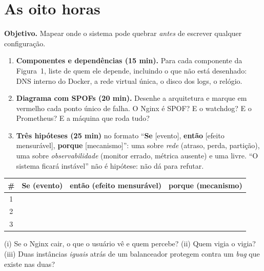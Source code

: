 \section{As oito horas}


\textbf{Objetivo.} Mapear onde o sistema pode quebrar \emph{antes} de escrever qualquer configuração.

\begin{enumerate}[leftmargin=*]
  \item \textbf{Componentes e dependências (15 min).} Para cada componente da Figura~1, liste de quem ele depende,
        incluindo o que não está desenhado: DNS interno do Docker, a rede virtual única, o disco dos logs, o relógio.
  \item \textbf{Diagrama com SPOFs (20 min).} Desenhe a arquitetura e marque \textcolor{vermelho}{em vermelho} cada
        ponto único de falha. O Nginx é SPOF? E o watchdog? E o Prometheus? E a máquina que roda tudo?
  \item \textbf{Três hipóteses (25 min)} no formato ``\textbf{Se} [evento], \textbf{então} [efeito mensurável],
        \textbf{porque} [mecanismo]'': uma sobre \emph{rede} (atraso, perda, partição), uma sobre
        \emph{observabilidade} (monitor errado, métrica ausente) e uma livre. ``O sistema ficará instável'' não é
        hipótese: não dá para refutar.
\end{enumerate}

\begin{center}
\begin{tabularx}{\linewidth}{@{}c>{\raggedright}X>{\raggedright}X>{\raggedright\arraybackslash}X@{}}
\toprule
\# & \textbf{Se (evento)} & \textbf{então (efeito mensurável)} & \textbf{porque (mecanismo)}\\ \midrule
1 & \rule{0pt}{3em} & & \\ \midrule
2 & \rule{0pt}{3em} & & \\ \midrule
3 & \rule{0pt}{3em} & & \\ \bottomrule
\end{tabularx}
\end{center}

\begin{checagem}
(i) Se o Nginx cair, o que o usuário vê e quem percebe? (ii) Quem vigia o vigia? (iii) Duas instâncias
\emph{iguais} atrás de um balanceador protegem contra um \emph{bug} que existe nas duas?
\end{checagem}

